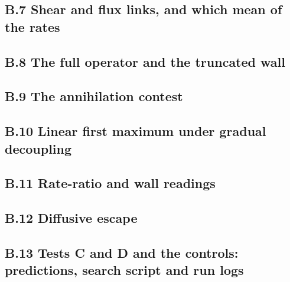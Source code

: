 \documentclass[11pt]{article}
\begin{document}
\subsection*{B.7 Shear and flux links, and which mean of the rates}




\subsection*{B.8 The full operator and the truncated wall}


\subsection*{B.9 The annihilation contest}


\subsection*{B.10 Linear first maximum under gradual decoupling}



\subsection*{B.11 Rate-ratio and wall readings}




\subsection*{B.12 Diffusive escape}


\subsection*{B.13 Tests C and D and the controls: predictions, search script and run logs}








\end{document}
